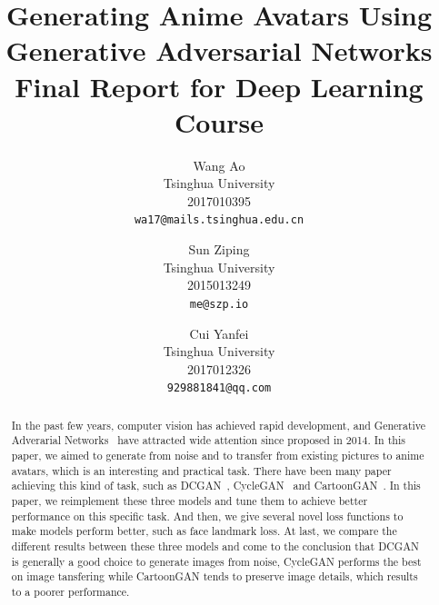 \documentclass[10pt,twocolumn,letterpaper]{article}
\begin{document}
\title{Generating Anime Avatars Using Generative Adversarial Networks \\
\large Final Report for Deep Learning Course}

\author{Wang Ao\\
Tsinghua University\\
2017010395\\
{\tt\small wa17@mails.tsinghua.edu.cn}
\and
Sun Ziping\\
Tsinghua University\\
2015013249\\
{\tt\small me@szp.io}
\and
Cui Yanfei\\
Tsinghua University\\
2017012326\\
{\tt\small 929881841@qq.com}
}

\maketitle

\begin{abstract}
In the past few years, computer vision has achieved rapid development, and
Generative Adverarial Networks~\cite{GAN} have attracted wide attention since
proposed in 2014. In this paper, we aimed to generate from noise and to transfer
from existing pictures to anime avatars, which is an interesting and practical
task. There have been many paper achieving this kind of task, such as
DCGAN~\cite{DCGAN}, CycleGAN~\cite{CycleGAN2017} and
CartoonGAN~\cite{CartoonGAN}. In this paper, we reimplement these three models
and tune them to achieve better performance on this specific task. And then, we
give several novel loss functions to make models perform better, such as face
landmark loss. At last, we compare the different results between these three
models and come to the conclusion that DCGAN is generally a good choice to
generate images from noise, CycleGAN performs the best on image tansfering while
CartoonGAN tends to preserve image details, which results to a poorer
performance.
\end{abstract}

\end{document}
